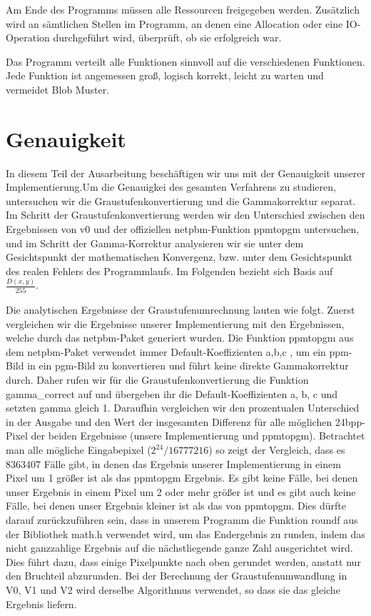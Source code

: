 \documentclass[course=erap]{aspdoc}
\begin{document}
\par
Am Ende des Programms müssen alle Ressourcen freigegeben werden. Zusätzlich wird an sämtlichen Stellen im Programm, an denen eine Allocation oder eine IO-Operation durchgeführt wird, überprüft, ob sie erfolgreich war.

\par
Das Programm verteilt alle Funktionen sinnvoll auf die verschiedenen Funktionen. Jede Funktion ist angemessen groß, logisch korrekt, leicht zu warten und vermeidet Blob Muster.

\section{Genauigkeit}

\par
In diesem Teil der Ausarbeitung beschäftigen wir uns mit der Genauigkeit unserer Implementierung.Um die Genauigkei des gesamten Verfahrens zu studieren, untersuchen wir die Graustufenkonvertierung und die Gammakorrektur separat. Im Schritt der Graustufenkonvertierung werden wir den Unterschied zwischen den Ergebnissen von v0 und der offiziellen netpbm-Funktion ppmtopgm untersuchen, und im Schritt der Gamma-Korrektur analysieren wir sie unter dem Gesichtspunkt der mathematischen Konvergenz, bzw. unter dem Gesichtspunkt des realen Fehlers des Programmlaufs. Im Folgenden bezieht sich Basis auf $\frac{D(x, y)}{255}$.

\par
Die analytischen Ergebnisse der Graustufenumrechnung lauten wie folgt. Zuerst vergleichen wir die Ergebnisse unserer Implementierung mit den Ergebnissen, welche durch das netpbm-Paket generiert wurden. Die Funktion ppmtopgm aus dem netpbm-Paket verwendet immer Default-Koeffizienten a,b,c , um ein ppm-Bild in ein pgm-Bild zu konvertieren und führt keine direkte Gammakorrektur durch. Daher rufen wir für die Graustufenkonvertierung die Funktion gamma\_correct auf und übergeben ihr die Default-Koeffizienten a, b, c und setzten gamma gleich 1. Daraufhin vergleichen wir den prozentualen Unterschied in der Ausgabe und den Wert der insgesamten Differenz für alle möglichen 24bpp-Pixel der beiden Ergebnisse (unsere Implementierung und ppmtopgm). Betrachtet man alle mögliche Eingabepixel ($2^24/16777216$) so zeigt der Vergleich, dass es 8363407 Fälle gibt, in denen das Ergebnis unserer Implementierung in einem Pixel um 1 größer ist als das ppmtopgm Ergebnis. Es gibt keine Fälle, bei denen unser Ergebnis in einem Pixel um 2 oder mehr größer ist und es gibt auch keine Fälle, bei denen unser Ergebnis kleiner ist als das von ppmtopgm. Dies dürfte darauf zurückzuführen sein, dass in unserem Programm die Funktion roundf aus der Bibliothek math.h verwendet wird, um das Endergebnis zu runden, indem das nicht ganzzahlige Ergebnis auf die nächstliegende ganze Zahl ausgerichtet wird. Dies führt dazu, dass einige Pixelpunkte nach oben gerundet werden, anstatt nur den Bruchteil abzurunden. Bei der Berechnung der Graustufenumwandlung in V0, V1 und V2 wird derselbe Algorithmus verwendet, so dass sie das gleiche Ergebnis liefern.
\end{document}
